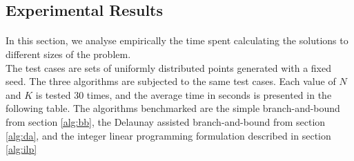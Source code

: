 \subsection{Experimental Results}
\paragraph{}
In this section, we analyse empirically the time spent calculating the solutions to different sizes of the problem. \\
The test cases are sets of uniformly distributed points generated with a fixed seed. The three algorithms are subjected to the same test cases. Each value of $N$ and $K$ is tested 30 times, and the average time in seconds is presented in the following table. The algorithms benchmarked are the simple branch-and-bound from section \ref{alg:bb}, the Delaunay assisted branch-and-bound from section \ref{alg:da}, and the integer linear programming formulation described in section \ref{alg:ilp}


